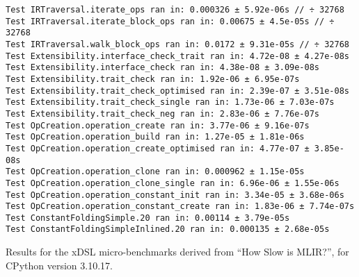 \begin{code}
    \begin{verbatim}
Test IRTraversal.iterate_ops ran in: 0.000326 ± 5.92e-06s // ÷ 32768
Test IRTraversal.iterate_block_ops ran in: 0.00675 ± 4.5e-05s // ÷ 32768
Test IRTraversal.walk_block_ops ran in: 0.0172 ± 9.31e-05s // ÷ 32768
Test Extensibility.interface_check_trait ran in: 4.72e-08 ± 4.27e-08s
Test Extensibility.interface_check ran in: 4.38e-08 ± 3.09e-08s
Test Extensibility.trait_check ran in: 1.92e-06 ± 6.95e-07s
Test Extensibility.trait_check_optimised ran in: 2.39e-07 ± 3.51e-08s
Test Extensibility.trait_check_single ran in: 1.73e-06 ± 7.03e-07s
Test Extensibility.trait_check_neg ran in: 2.83e-06 ± 7.76e-07s
Test OpCreation.operation_create ran in: 3.77e-06 ± 9.16e-07s
Test OpCreation.operation_build ran in: 1.27e-05 ± 1.81e-06s
Test OpCreation.operation_create_optimised ran in: 4.77e-07 ± 3.85e-08s
Test OpCreation.operation_clone ran in: 0.000962 ± 1.15e-05s
Test OpCreation.operation_clone_single ran in: 6.96e-06 ± 1.55e-06s
Test OpCreation.operation_constant_init ran in: 3.34e-05 ± 3.68e-06s
Test OpCreation.operation_constant_create ran in: 1.83e-06 ± 7.74e-07s
Test ConstantFoldingSimple.20 ran in: 0.00114 ± 3.79e-05s
Test ConstantFoldingSimpleInlined.20 ran in: 0.000135 ± 2.68e-05s
    \end{verbatim}
    \caption{Results for the xDSL micro-benchmarks derived from ``How Slow is MLIR?'', for CPython version 3.10.17.}
    \label{listing:how-slow-is-mlir-xdsl-microbenchmark-results-310}
\end{code}
